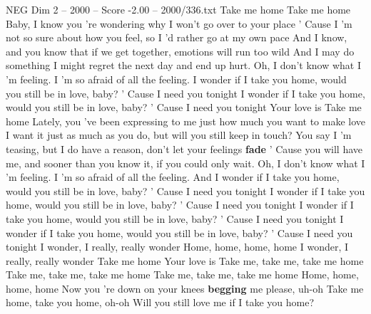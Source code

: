 \begin{textsample}{NEG Dim 2 – 2000 – Score -2.00 – 2000/336.txt}  \label{ex:f2_neg_035}
Take me home Take me home Baby, I know you 're wondering why I won't go over to your place ' Cause I 'm not so sure about how you feel, so I 'd rather go at my own pace And I know, and you know that if we get together, emotions will run too wild And I may do something I might regret the next day and end up hurt.
Oh, I don't know what I 'm feeling.
I 'm so afraid of all the feeling.
I wonder if I take you home, would you still be in love, baby? ' Cause I need you tonight I wonder if I take you home, would you still be in love, baby? ' Cause I need you tonight Your love is Take me home Lately, you 've been expressing to me just how much you want to make love I want it just as much as you do, but will you still keep in touch?
You say I 'm teasing, but I do have a reason, don't let your feelings \textbf{fade} ' Cause you will have me, and sooner than you know it, if you could only wait.
Oh, I don't know what I 'm feeling.
I 'm so afraid of all the feeling.
And I wonder if I take you home, would you still be in love, baby? ' Cause I need you tonight I wonder if I take you home, would you still be in love, baby? ' Cause I need you tonight I wonder if I take you home, would you still be in love, baby? ' Cause I need you tonight I wonder if I take you home, would you still be in love, baby? ' Cause I need you tonight I wonder, I really, really wonder Home, home, home, home I wonder, I really, really wonder Take me home Your love is Take me, take me, take me home Take me, take me, take me home Take me, take me, take me home Home, home, home, home Now you 're down on your knees \textbf{begging} me please, uh-oh Take me home, take you home, oh-oh Will you still love me if I take you home?

\end{textsample}
